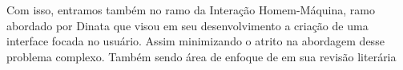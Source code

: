 Com isso, entramos também no ramo da Interação Homem-Máquina, ramo abordado por Dinata \cite{andre_interaction_2018} que visou em seu desenvolvimento a criação de uma interface focada no usuário. Assim minimizando o atrito na abordagem desse problema complexo. Também sendo área de enfoque de \cite{alencar_visualization_2019} em sua revisão literária




